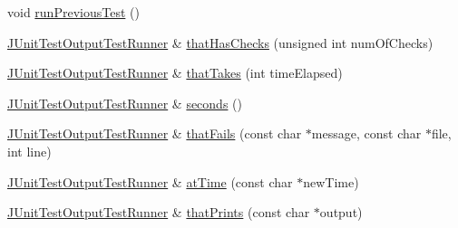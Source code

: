 \begin{DoxyCompactItemize}
\item 
void \hyperlink{class_j_unit_test_output_test_runner_a5040b830219d455945176ffc02934ffc}{run\+Previous\+Test} ()
\item 
\hyperlink{class_j_unit_test_output_test_runner}{J\+Unit\+Test\+Output\+Test\+Runner} \& \hyperlink{class_j_unit_test_output_test_runner_abd3497b08f45cf4529cb71f230542b68}{that\+Has\+Checks} (unsigned int num\+Of\+Checks)
\item 
\hyperlink{class_j_unit_test_output_test_runner}{J\+Unit\+Test\+Output\+Test\+Runner} \& \hyperlink{class_j_unit_test_output_test_runner_aeb39d1b8eb1774f04a700c51c6673bfa}{that\+Takes} (int time\+Elapsed)
\item 
\hyperlink{class_j_unit_test_output_test_runner}{J\+Unit\+Test\+Output\+Test\+Runner} \& \hyperlink{class_j_unit_test_output_test_runner_a24af45a023cc37b3d12985921e6fe397}{seconds} ()
\item 
\hyperlink{class_j_unit_test_output_test_runner}{J\+Unit\+Test\+Output\+Test\+Runner} \& \hyperlink{class_j_unit_test_output_test_runner_a70cbc7082f0c053ce37c7663e0b35781}{that\+Fails} (const char $\ast$message, const char $\ast$file, int line)
\item 
\hyperlink{class_j_unit_test_output_test_runner}{J\+Unit\+Test\+Output\+Test\+Runner} \& \hyperlink{class_j_unit_test_output_test_runner_a3c01ae09839e2a5f91e848ba42857b6c}{at\+Time} (const char $\ast$new\+Time)
\item 
\hyperlink{class_j_unit_test_output_test_runner}{J\+Unit\+Test\+Output\+Test\+Runner} \& \hyperlink{class_j_unit_test_output_test_runner_a260f56aeedc83c3543aa5bb8cc57dc36}{that\+Prints} (const char $\ast$output)
\end{DoxyCompactItemize}
